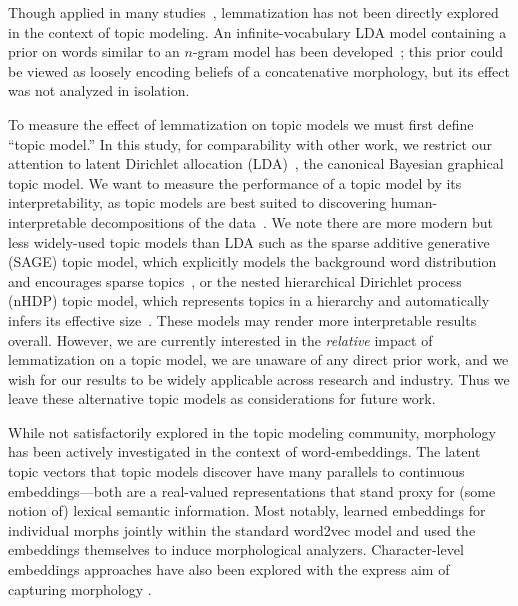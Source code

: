 \documentclass[11pt,letterpaper]{article}
\newcommand{\Note}[3]{\sethlcolor{#2}\hl{[\textbf{#1}: #3]}}
\renewcommand{\Note}[3]{}
\newcommand{\ryan}[1]{\Note{ryan}{lightorange}{#1}}
\newcommand{\todo}[1]{\Note{todo}{red}{#1}}
\begin{document}
{Though applied in many
studies~\cite{deerwester1990,hofmann1999,mei2007,nallapati2008,lin2009},
lemmatization has not been directly explored in the context of topic
modeling.  An infinite-vocabulary LDA model containing a prior on words
similar to an $n$-gram model has been developed~\cite{zhai2013}; this
prior could be viewed as loosely encoding beliefs of a
concatenative morphology, but its effect was not analyzed in
isolation.

To measure the effect of lemmatization on topic models we must first
define ``topic model.''  In this study, for comparability with other
work, we restrict our attention to latent Dirichlet allocation
(LDA)~\cite{blei2003}, the canonical Bayesian graphical topic model.
We want to measure the performance of a topic model by its
interpretability, as topic models are best suited to discovering
human-interpretable decompositions of the data~\cite{may2015}.
We note there are more modern but less widely-used topic models than
LDA such as the sparse additive generative
(SAGE) topic model, which explicitly models the background word
distribution and encourages sparse topics~\cite{eisenstein2011}, or the
nested hierarchical Dirichlet process (nHDP) topic model, which
represents topics in a hierarchy and automatically infers its effective
size~\cite{paisley2015}.  These models may render more interpretable
results overall.  However, we are currently interested in the
\emph{relative} impact of lemmatization on a topic model, we are
unaware of any direct prior work, and we wish for our results to be
widely applicable across research and industry.  Thus we leave these
alternative topic models as considerations for future work.

While not satisfactorily explored in the topic modeling community,
morphology has been actively investigated in the context of
word-embeddings.  The latent topic vectors that topic models discover
have many parallels to continuous embeddings---both are a real-valued
representations that stand proxy for (some notion of) lexical semantic
information. Most notably,  learned
embeddings for individual morphs jointly within the standard {\sc word2vec}
model \cite{mikolov2013distributed} and  used the embeddings
themselves to induce morphological analyzers. Character-level embeddings approaches
have also been explored with the express aim of capturing morphology \cite{santos2014learning,LingDBTFAML15}.

\ryan{Add self citation to NAACL 2015 in camera ready. Keep out for anonymity.}
\todo{mention word sense disambiguation applications of topic models?
    they rely more heavily on lemmatization but use topic models (to
    some degree) as substitutes for models of word sense...}


}
\end{document}
